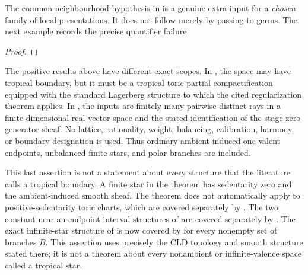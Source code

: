 The common-neighbourhood hypothesis in
 is a genuine extra input for a
\emph{chosen} family of local presentations.  It does not follow merely by
passing to germs.  The next example records the precise quantifier failure.

\begin{example}
\label{ex:p071-no-common-domain-for-chosen-rows}

\end{example}

\begin{proof}

\end{proof}

\begin{remark}
\label{rem:ch16-collapse-scope-firewall}
The positive results above have different exact scopes.  In
, the space may have tropical
boundary, but it must be a tropical toric partial compactification equipped
with the standard Lagerberg structure to which the cited regularization
theorem applies.  In
, the inputs are finitely many
pairwise distinct rays in a finite-dimensional real vector space and the
stated identification of the stage-zero generator sheaf.  No lattice,
rationality, weight, balancing, calibration, harmony, or boundary
designation is used.  Thus ordinary ambient-induced one-valent endpoints,
unbalanced finite stars, and polar branches are included.

This last assertion is not a statement about every structure that the
literature calls a tropical boundary.  A finite star in the theorem has
sedentarity zero and the ambient-induced smooth sheaf.  The theorem does not
automatically apply to positive-sedentarity toric charts, which are covered
separately by .  The two
constant-near-an-endpoint interval structures of
\cite[Example~6.7.2]{CLD25} are covered separately by
.  The exact infinite-star structure of
\cite[\S6.7.3]{CLD25} is now covered by
 for every nonempty set of
branches $B$.  This assertion uses precisely the CLD topology and smooth
structure stated there; it is not a theorem about every nonambient or
infinite-valence space called a tropical star.


\end{remark}
